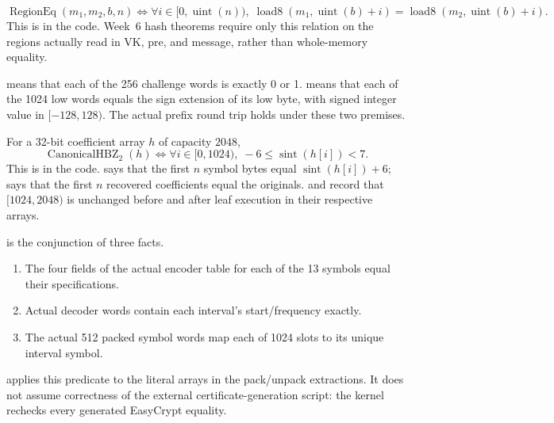 \begin{definition}
\label{def:region-eq}
\[
  \operatorname{RegionEq}(m_1,m_2,b,n)
  \Longleftrightarrow
  \forall i\in[0,\operatorname{uint}(n)),\;
  \operatorname{load8}(m_1,\operatorname{uint}(b)+i)
  =\operatorname{load8}(m_2,\operatorname{uint}(b)+i).
\]
This is  in the code. Week~6 hash theorems require only
this relation on the regions actually read in VK, pre, and message, rather than
whole-memory equality.
\end{definition}

\begin{definition}
\label{def:signature-prefix-canonical}
 means that each of the 256 challenge words
is exactly 0 or 1.  means that each of the
1024 low words equals the sign extension of its low byte, with signed integer
value in \([-128,128)\). The actual prefix round trip holds under these two premises.
\end{definition}

\begin{definition}
\label{def:canonical-hbz}
For a 32-bit coefficient array \(h\) of capacity \(2048\),
\[
  \operatorname{CanonicalHBZ}_2(h)
  \Longleftrightarrow
  \forall i\in[0,1024),\;-6\le\operatorname{sint}(h[i])<7.
\]
This is  in the code.
 says that the first \(n\) symbol bytes equal
\(\operatorname{sint}(h[i])+6\);  says that the
first \(n\) recovered coefficients equal the originals.
 and  record that
\([1024,2048)\) is unchanged before and after leaf execution in their respective arrays.
\end{definition}

\begin{definition}
\label{def:hbz-table-certificate}
 is the conjunction of three facts.
\begin{enumerate}
  \item The four fields of the actual encoder table for each of the 13 symbols equal their specifications.
  \item Actual decoder words contain each interval's start/frequency exactly.
  \item The actual 512 packed symbol words map each of 1024 slots to its unique interval symbol.
\end{enumerate}
 applies this predicate to the
literal arrays in the pack/unpack extractions. It does not assume correctness
of the external certificate-generation script: the kernel rechecks every
generated EasyCrypt equality.
\end{definition}

